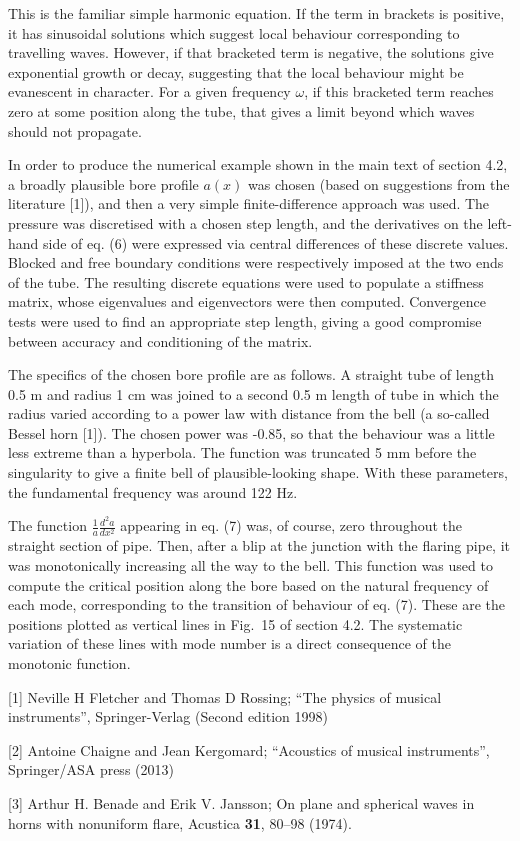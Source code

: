   This is the familiar simple harmonic equation. If the term in brackets is 
  positive, it has sinusoidal solutions which suggest local behaviour 
  corresponding to travelling waves. However, if that bracketed term is 
  negative, the solutions give exponential growth or decay, suggesting that the 
  local behaviour might be evanescent in character. For a given frequency 
  $\omega$, if this bracketed term reaches zero at some position along the 
  tube, that gives a limit beyond which waves should not propagate. 

  In order to produce the numerical example shown in the main text of section 
  4.2, a broadly plausible bore profile $a(x)$ was chosen (based on suggestions 
  from the literature [1]), and then a very simple finite-difference approach 
  was used. The pressure was discretised with a chosen step length, and the 
  derivatives on the left-hand side of eq. (6) were expressed via central 
  differences of these discrete values. Blocked and free boundary conditions 
  were respectively imposed at the two ends of the tube. The resulting discrete 
  equations were used to populate a stiffness matrix, whose eigenvalues and 
  eigenvectors were then computed. Convergence tests were used to find an 
  appropriate step length, giving a good compromise between accuracy and 
  conditioning of the matrix. 

  The specifics of the chosen bore profile are as follows. A straight tube of 
  length 0.5 m and radius 1 cm was joined to a second 0.5 m length of tube in 
  which the radius varied according to a power law with distance from the bell 
  (a so-called Bessel horn [1]). The chosen power was -0.85, so that the 
  behaviour was a little less extreme than a hyperbola. The function was 
  truncated 5 mm before the singularity to give a finite bell of 
  plausible-looking shape. With these parameters, the fundamental frequency was 
  around 122 Hz. 

  The function $\frac{1}{a} \frac{d^2a}{dx^2}$ appearing in eq. (7) was, of 
  course, zero throughout the straight section of pipe. Then, after a blip at 
  the junction with the flaring pipe, it was monotonically increasing all the 
  way to the bell. This function was used to compute the critical position 
  along the bore based on the natural frequency of each mode, corresponding to 
  the transition of behaviour of eq. (7). These are the positions plotted as 
  vertical lines in Fig.\ 15 of section 4.2. The systematic variation of these 
  lines with mode number is a direct consequence of the monotonic function. 

  \sectionreferences{}[1] Neville H Fletcher and Thomas D Rossing; ``The 
  physics of musical instruments'', Springer-Verlag (Second edition 1998) 

  [2] Antoine Chaigne and Jean Kergomard; ``Acoustics of musical instruments'', 
  Springer/ASA press (2013) 

  [3] Arthur H. Benade and Erik V. Jansson; On plane and spherical waves in 
  horns with nonuniform flare, Acustica \textbf{31}, 80--98 (1974). 